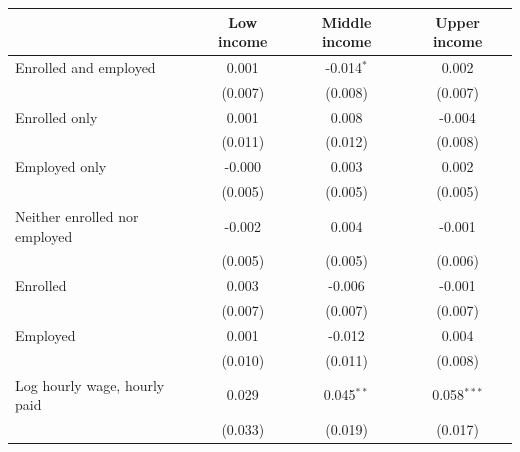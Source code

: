 \begin{tabular}{lccc}
\toprule
 & Low income & Middle income & Upper income \\
\midrule
Enrolled and employed & 0.001 & -0.014$^{*}$ & 0.002 \\
 & (0.007) & (0.008) & (0.007) \\
Enrolled only & 0.001 & 0.008 & -0.004 \\
 & (0.011) & (0.012) & (0.008) \\
Employed only & -0.000 & 0.003 & 0.002 \\
 & (0.005) & (0.005) & (0.005) \\
Neither enrolled nor employed & -0.002 & 0.004 & -0.001 \\
 & (0.005) & (0.005) & (0.006) \\
Enrolled & 0.003 & -0.006 & -0.001 \\
 & (0.007) & (0.007) & (0.007) \\
Employed & 0.001 & -0.012 & 0.004 \\
 & (0.010) & (0.011) & (0.008) \\
Log hourly wage, hourly paid & 0.029 & 0.045$^{**}$ & 0.058$^{***}$ \\
 & (0.033) & (0.019) & (0.017) \\
\bottomrule
\end{tabular}
